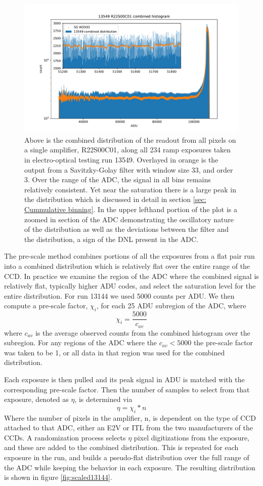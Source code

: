 \documentclass[11pt, letterpaper]{article}
\begin{document}
\begin{figure}
    \centering
    \includegraphics[width=0.5\linewidth]{bar13549.pdf}
    \caption{Above is the combined distribution of the readout from all pixels on a single amplifier, R22S00C01, along all 234 ramp exposures taken in electro-optical testing run 13549. Overlayed in orange is the output from a Savitzky-Golay filter with window size 33, and order 3. Over the range of the ADC, the signal in all bins remains relatively consistent. Yet near the saturation there is a large peak in the distribution which is discussed in detail in section \ref{sec: Cummulative binning}. In the upper lefthand portion of the plot is a zoomed in section of the ADC demonstrating the oscillatory nature of the distribution as well as the deviations between the filter and the distribution, a sign of the DNL present in the ADC.}
    \label{fig:filter13549}
\end{figure}


The pre-scale method combines portions of all the exposures from a flat pair run into a combined distribution which is relatively flat over the entire range of the CCD. 
In practice we examine the region of the ADC where the combined signal is relatively flat, typically higher ADU codes, and select the saturation level for the entire distribution. 
For run 13144 we used 5000 counts per ADU. 
 We then compute a pre-scale factor, $\chi _i$, for each 25 ADU subregion of the ADC, where
\begin{equation}
\chi_i = \frac{5000}{c_{av}}
\label{eq: prescale}
\end{equation}
where $c_{av}$ is the average observed counts from the combined histogram over the subregion. 
For any regions of the ADC where the $c_{av} < 5000$ the pre-scale factor was taken to be 1, or all data in that region was used for the combined distribution. 
\indent 


Each exposure is then pulled and its peak signal in ADU is matched with the corresponding pre-scale factor. 
Then the number of samples to select from that exposure, denoted as $\eta $, is determined via
 \begin{equation}
 \eta = \chi_i *n 
 \label{eq:selectedsamples}
\end{equation}
Where the number of pixels in the amplifier, n, is dependent on the type of CCD attached to that ADC, either an E2V or ITL from the two manufacturers of the CCDs. 
A randomization process selects $\eta$ pixel digitizations from the exposure, and these are added to the combined distribution. 
This is repeated for each exposure in the run, and builds a pseudo-flat distribution over the full range of the ADC while keeping the behavior in each exposure. 
The resulting distribution is shown in figure \ref{fig:scaled13144}. 
\end{document}
